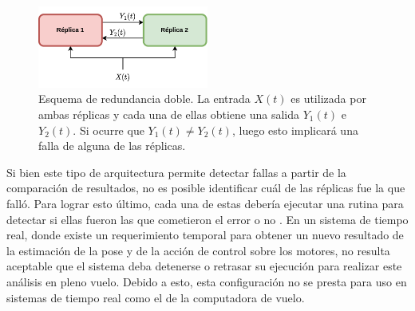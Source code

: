 \begin{figure}[htb]
    \centering
    \includegraphics[width=0.5\textwidth]{img/redundancia_doble.png}
    \caption{Esquema de redundancia doble. La entrada $X(t)$ es utilizada por ambas réplicas y cada una de ellas obtiene una salida $Y_1(t)$ e $Y_2(t)$. Si ocurre que $Y_1(t) \neq Y_2(t)$, luego esto implicará una falla de alguna de las réplicas. }
    \label{fig:redundancia_doble}
\end{figure}


Si bien este tipo de arquitectura permite detectar fallas a partir de la comparación de resultados, no es posible identificar cuál de las réplicas fue la que falló. Para lograr esto último, cada una de estas debería ejecutar una rutina para detectar si ellas fueron las que cometieron el error o no \cite{baleani2003fault}. En un sistema de tiempo real, donde existe un requerimiento temporal para obtener un nuevo resultado de la estimación de la pose y de la acción de control sobre los motores, no resulta aceptable que el sistema deba detenerse o retrasar su ejecución para realizar este análisis en pleno vuelo. Debido a esto, esta configuración no se presta para uso en sistemas de tiempo real como el de la computadora de vuelo.


